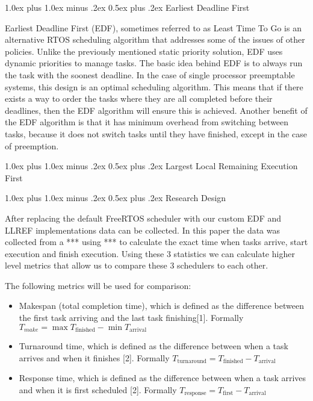 \documentclass[transmag]{IEEEtran}
\makeatletter
\renewcommand{\section}{\@startsection{section}{1}{\z@}%
  {1.0ex plus 1.0ex minus .2ex}%
  {0.5ex plus .2ex}%
  {\normalfont\large\bfseries}}
\makeatother
\begin{document}
\section{Earliest Deadline First} 

Earliest Deadline First (EDF), sometimes referred to as Least Time To Go is an alternative RTOS scheduling algorithm that addresses some of the issues of other policies. Unlike the previously mentioned static priority solution, EDF uses dynamic priorities to manage tasks. The basic idea behind EDF is to always run the task with the soonest deadline. In the case of single processor preemptable systems, this design is an optimal scheduling algorithm. This means that if there exists a way to order the tasks where they are all completed before their deadlines, then the EDF algorithm will ensure this is achieved. Another benefit of the EDF algorithm is that it has minimum overhead from switching between tasks, because it does not switch tasks until they have finished, except in the case of preemption. 

\section{Largest Local Remaining Execution First} 

\section{Research Design} 

After replacing the default FreeRTOS scheduler with our custom EDF and LLREF implementations data can be collected. In this paper the data was collected from a *** using *** to calculate the exact time when tasks arrive, start execution and finish execution. Using these 3 statistics we can calculate higher level metrics that allow us to compare these 3 schedulers to each other. 

The following metrics will be used for comparison: 

\begin{itemize}
  \item Makespan (total completion time), which is defined as the difference between the first task arriving and the last task finishing[1]. Formally $T_{make} = \max T_{\text{finished}} - \min T_{\text{arrival}}$
  \item 
    Turnaround time, which is defined as the difference between when a task arrives and when it finishes [2]. Formally $T_{\text{turnaround}} = T_{\text{finished}} - T_{\text{arrival}}$
  \item Response time, which is defined as the difference between when a task arrives and when it is first scheduled [2]. Formally $T_{\text{response}} = T_{\text{first}} - T_{\text{arrival}}$
\end{itemize}
\end{document}
